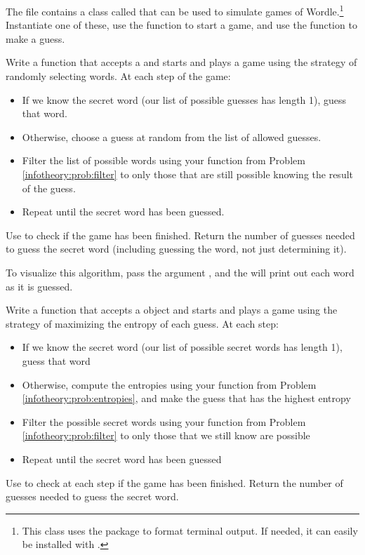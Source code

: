 \begin{problem}\label{problem:benchmark_algorithm}
	The file  contains a class called  that can be used to simulate games of Wordle.\footnote{This class uses the  package to format terminal output. If needed, it can easily be installed with .}
	Instantiate one of these, use the  function to start a game, and use the  function to make a guess.

	Write a function that accepts a  and starts and plays a game using the strategy of randomly selecting words.
	At each step of the game:
	\begin{itemize}
		\item If we know the secret word (our list of possible guesses has length 1), guess that word.
		\item Otherwise, choose a guess at random from the list of allowed guesses.
		\item Filter the list of possible words using your function from Problem \ref{infotheory:prob:filter} to only those that are still possible knowing the result of the guess.
		\item Repeat until the secret word has been guessed.
	\end{itemize}
	Use  to check if the game has been finished.
	Return the number of guesses needed to guess the secret word (including guessing the word, not just determining it).

	To visualize this algorithm, pass the argument , and the  will print out each word as it is guessed.
\end{problem}

\begin{problem}\label{problem:wordle_algorithm}
	Write a function that accepts a  object and starts and plays a game using the strategy of maximizing the entropy of each guess.
	At each step:
	\begin{itemize}
		\item If we know the secret word (our list of possible secret words has length 1), guess that word
		\item Otherwise, compute the entropies using your function from Problem \ref{infotheory:prob:entropies}, and make the guess that has the highest entropy
		\item Filter the possible secret words using your function from Problem \ref{infotheory:prob:filter} to only those that we still know are possible
		\item Repeat until the secret word has been guessed
	\end{itemize}
	Use  to check at each step if the game has been finished.
	Return the number of guesses needed to guess the secret word.
\end{problem}

